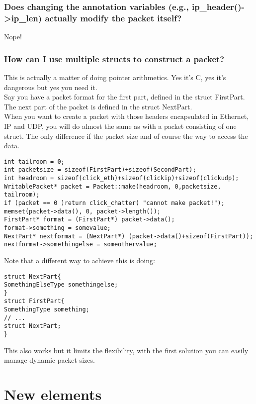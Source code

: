 \documentclass[a4paper]{article}
\begin{document}
\subsubsection*{Does changing the annotation variables (e.g.,
ip\_header()-\textgreater{}ip\_len) actually modify the packet itself?}

Nope!

\subsubsection*{How can I use multiple structs to construct a packet?}

This is actually a matter of doing pointer arithmetics. Yes it's C, yes
it's dangerous but yes you need it.\\ Say you have a packet format for
the first part, defined in the struct FirstPart. The next part of the
packet is defined in the struct NextPart.\\ When you want to create a
packet with those headers encapsulated in Ethernet, IP and UDP, you will
do almost the same as with a packet consisting of one struct. The only
difference if the packet size and of course the way to access the
data.

\begin{lstlisting}
int tailroom = 0;
int packetsize = sizeof(FirstPart)+sizeof(SecondPart);
int headroom = sizeof(click_eth)+sizeof(clickip)+sizeof(clickudp);
WritablePacket* packet = Packet::make(headroom, 0,packetsize, tailroom);
if (packet == 0 )return click_chatter( "cannot make packet!");
memset(packet->data(), 0, packet->length());
FirstPart* format = (FirstPart*) packet->data();
format->something = somevalue;
NextPart* nextformat = (NextPart*) (packet->data()+sizeof(FirstPart));
nextformat->somethingelse = someothervalue; 
\end{lstlisting}

Note that a different way to achieve this is doing:
\begin{lstlisting}
struct NextPart{
SomethingElseType somethingelse;
}
struct FirstPart{
SomethingType something;
// ...
struct NextPart;
}

\end{lstlisting}

This also works but it limits the flexibility, with the first solution
you can easily manage dynamic packet sizes.

\section{New elements}
\end{document}
